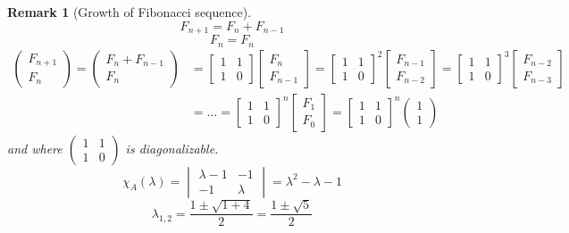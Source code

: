 \documentclass{article}
\newcounter{lecref}[section]
\numberwithin{lecref}{section}
\newtheorem{remark}[lecref]{Remark}
\newcommand{\vectwo}[2]{\begin{pmatrix} #1 \\ #2 \end{pmatrix}}
\begin{document}
\begin{remark}[Growth of Fibonacci sequence]
  \[ F_{n+1} = F_n + F_{n-1} \]
  \[ F_n = F_n \]
  \begin{align*}
    \vectwo{F_{n+1}}{F_n}
      = \vectwo{F_n + F_{n-1}}{F_n}
      &= \begin{bmatrix} 1 & 1 \\ 1 & 0 \end{bmatrix} \begin{bmatrix} F_n \\ F_{n-1} \end{bmatrix} 
      = \begin{bmatrix} 1 & 1 \\ 1 & 0 \end{bmatrix}^2 \begin{bmatrix} F_{n-1} \\ F_{n-2} \end{bmatrix} 
      = \begin{bmatrix} 1 & 1 \\ 1 & 0 \end{bmatrix}^3 \begin{bmatrix} F_{n-2} \\ F_{n-3} \end{bmatrix} \\
      &= \dots
      = \begin{bmatrix} 1 & 1 \\ 1 & 0 \end{bmatrix}^n \begin{bmatrix} F_1 \\ F_0 \end{bmatrix}
      = \begin{bmatrix} 1 & 1 \\ 1 & 0 \end{bmatrix}^n \vectwo11
  \end{align*}
  and where $\begin{pmatrix} 1 & 1 \\ 1 & 0 \end{pmatrix}$ is diagonalizable.
  \[
    \chi_A(\lambda) = \begin{vmatrix}
      \lambda-1 & -1 \\
      -1 & \lambda
    \end{vmatrix} = \lambda^2 - \lambda - 1
  \] \[
    \lambda_{1,2} = \frac{1 \pm \sqrt{1 + 4}}{2} = \frac{1 \pm \sqrt{5}}{2}
  \]


\end{remark}
\end{document}
